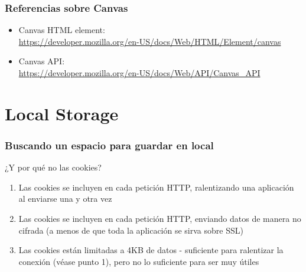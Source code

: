 
\begin{frame}
\frametitle{Referencias sobre Canvas}

\begin{itemize}
  \item Canvas HTML element: \\ {\footnotesize \url{https://developer.mozilla.org/en-US/docs/Web/HTML/Element/canvas}}
  \item Canvas API: \\ {\footnotesize \url{https://developer.mozilla.org/en-US/docs/Web/API/Canvas_API}}
\end{itemize}

\end{frame}


\section{Local Storage}


\begin{frame}
\frametitle{Buscando un espacio para guardar en local}

¿Y por qué no las cookies?

\begin{enumerate}
  \item Las cookies se incluyen en cada petición HTTP, ralentizando una aplicación al enviarse una y otra vez
  \item Las cookies se incluyen en cada petición HTTP, enviando datos de manera no cifrada (a menos de que toda la aplicación se sirva sobre SSL)
  \item Las cookies están limitadas a 4KB de datos - suficiente para ralentizar la conexión (véase punto 1), pero no lo suficiente para ser muy útiles
\end{enumerate}

\end{frame}


